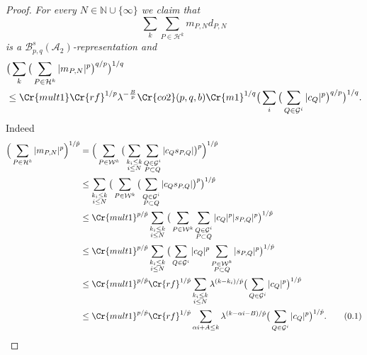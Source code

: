 \documentclass{amsart}
\theoremstyle{definition}
\renewcommand{\theequation}{\thesection.\arabic{equation}}
\newcommand\numberthis{\addtocounter{equation}{1}\tag{\theequation}} %
\newcommand{\Crr}[1]{\Cr{#1}}
\begin{document}
\begin{proof}
 {\it For every $N\in \mathbb{N}\cup \{\infty\}$ we claim that 
\begin{equation}\label{a222}  \sum_k \sum_{P\in \mathcal{H}^k} m_{P,N}  d_{P,N}\end{equation}
is a $\mathcal{B}^s_{p,q}(\mathcal{A}_2)$-representation and }
\begin{align}&   \big(\sum_k \big( \sum_{ P\in \mathcal{H}^k} |m_{P,N}|^p \big)^{q/p}\big)^{1/q} \nonumber \\
\label{ess} &\leq \Crr{mult1}  \Crr{rf}^{1/p}\lambda^{-\frac{B}{p}} \Crr{co2}(p,q,b) \Crr{m1}^{1/q}\big( \sum_i  \big( \sum_{Q\in \mathcal{G}^i}  |c_{Q}|^p  \big)^{q/p}\big)^{1/q}.
\end{align}
Indeed 
\begin{align*} 
\Big( \sum_{P \in \mathcal{H}^k} |m_{P,N}|^p \Big)^{1/\hat{p}}&= \Big(  \sum_{P \in \mathcal{W}^k} \big( \sum_{\substack{ k_i\leq k \\ i\leq N}} \sum_{ \substack{Q\in \mathcal{G}^i\\ P \subset Q}} |c_Q s_{P,Q}|\big)^p \Big)^{1/\hat{p}} \\
&\leq  \sum_{\substack{ k_i\leq k \\ i\leq N}}  \big( \sum_{P \in \mathcal{W}^k} \big( \sum_{ \substack{Q\in \mathcal{G}^i\\ P \subset Q}} |c_Q s_{P,Q}|\big)^p \big)^{1/\hat{p}} \\
&\leq \Crr{mult1}^{p/\hat{p}} \sum_{\substack{ k_i\leq k \\ i\leq N}}  \big( \sum_{P \in \mathcal{W}^k} \sum_{ \substack{Q\in \mathcal{G}^i\\ P \subset Q}} |c_Q|^p |s_{P,Q}|^p \big)^{1/\hat{p}} \\
&\leq \Crr{mult1}^{p/\hat{p}}  \sum_{\substack{ k_i\leq k \\ i\leq N}}  \big(\sum_{Q\in \mathcal{G}^i}   |c_Q|^p  \sum_{\substack{P \in \mathcal{W}^k\\ P \subset Q}}  |s_{P,Q}|^p \big)^{1/\hat{p}} \\
&\leq  \Crr{mult1}^{p/\hat{p}}   \Crr{rf}^{1/\hat{p}}  \sum_{\substack{k_i\leq k \\ i\leq N}}  \lambda^{(k-k_i)/\hat{p}}   \big( \sum_{Q\in \mathcal{G}^i}  |c_{Q}|^p  \big)^{1/\hat{p}} \\
&\leq  \Crr{mult1}^{p/\hat{p}}   \Crr{rf}^{1/\hat{p}}  \sum_{\substack{\alpha i + A\leq k}}  \lambda^{(k-\alpha i -B)/\hat{p}}   \big( \sum_{Q\in \mathcal{G}^i}  |c_{Q}|^p  \big)^{1/\hat{p}} . \numberthis \label{for}

\end{align*}
\end{proof}
\end{document}
